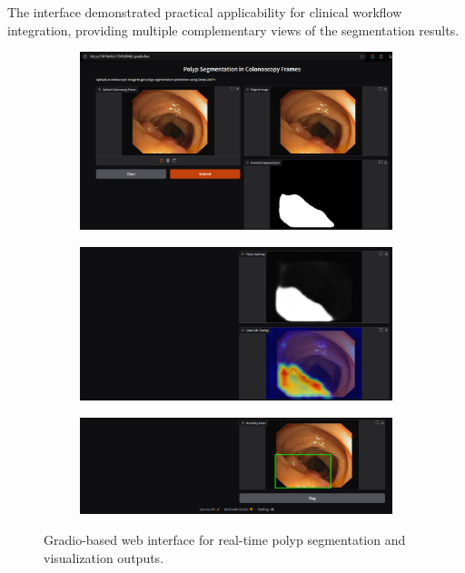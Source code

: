 \documentclass[a4paper,12pt]{report}
\begin{document}
The interface demonstrated practical applicability for clinical workflow integration, providing multiple complementary views of the segmentation results.

\begin{figure}[H]
\centering
\begin{subfigure}[t]{0.32\textwidth}
  \centering
  \includegraphics[width=\linewidth]{interface.png}


\end{subfigure}\hfill
\begin{subfigure}[t]{0.32\textwidth}
  \centering
  \includegraphics[width=\linewidth]{interface_2.png}


\end{subfigure}\hfill
\begin{subfigure}[t]{0.32\textwidth}
  \centering
  \includegraphics[width=\linewidth]{interface_3.png}


\end{subfigure}
\caption{Gradio-based web interface for real-time polyp segmentation and visualization outputs.}
\label{fig:gradio_interface}
\end{figure}
\end{document}
